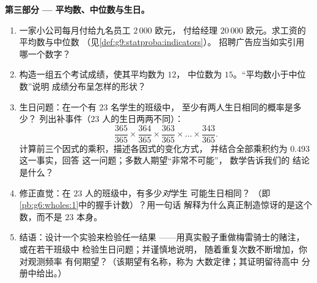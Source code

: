 \begin{problem}
\medskip
\noindent\textbf{第三部分 --- 平均数、中位数与生日。}
\begin{enumerate}[resume]
  \item 一家小公司每月付给九名员工 $2\,000$ 欧元，
        付给经理 $20\,000$ 欧元。求工资的平均数与中位数
        （见\cref{def:g9:statproba:indicators}）。
        招聘广告应当如实引用
        哪一个数字？
  \item 构造一组五个考试成绩，使其平均数为 $12$，
        中位数为 $15$。“平均数小于中位数”说明
        成绩分布呈怎样的形状？
  \item 生日问题：在一个有 $23$ 名学生的班级中，
        至少有两人生日相同的概率是多少？
        列出补事件（$23$ 人的生日两两不同）：
        \[
        \frac{365}{365} \times \frac{364}{365} \times
        \frac{363}{365} \times \dots \times \frac{343}{365} .
        \]
        计算前三个因式的乘积，描述各因式的变化方式，
        并结合全部乘积约为 $0.493$ 这一事实，回答
        这一问题；多数人期望“非常不可能”，
        数学告诉我们的
        结论是什么？
  \item 修正直觉：在 $23$ 人的班级中，有多少\emph{对}学生
        可能生日相同？
        （即\cref{pb:g6:wholes:1}中的握手计数）？用一句话
        解释为什么真正制造惊讶的是这个数，而不是
        $23$ 本身。
  \item 结语：设计一个实验来检验任一结果
        ——用真实骰子重做梅雷骑士的赌注，或在若干班级中
        检验生日问题；并谨慎地说明，
        随着重复次数不断增加，你对观测频率
        有何期望？（该期望有名称，称为
        大数定律；其证明留待高中
        分册中给出。）
\end{enumerate}
\end{problem}
